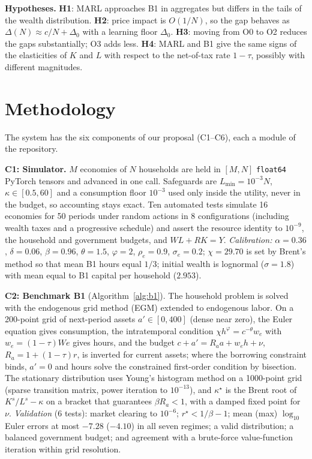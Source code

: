 \documentclass{article}
\begin{document}
\textbf{Hypotheses.} \textbf{H1}: MARL approaches B1 in aggregates but differs in the tails of the wealth distribution. \textbf{H2}: price impact is $O(1/N)$, so the gap behaves as $\Delta(N)\approx c/N+\Delta_0$ with a learning floor $\Delta_0$. \textbf{H3}: moving from O0 to O2 reduces the gaps substantially; O3 adds less. \textbf{H4}: MARL and B1 give the same signs of the elasticities of $K$ and $L$ with respect to the net-of-tax rate $1-\tau$, possibly with different magnitudes.

\section{Methodology}\label{sec:method}
The system has the six components of our proposal (C1--C6), each a module of the repository.

\textbf{C1: Simulator.} $M$ economies of $N$ households are held in $[M,N]$ \texttt{float64} PyTorch tensors and advanced in one call. Safeguards are $L_{\min}=10^{-3}N$, $\kappa\in[0.5,60]$ and a consumption floor $10^{-3}$ used only inside the utility, never in the budget, so accounting stays exact. Ten automated tests simulate 16 economies for 50 periods under random actions in 8 configurations (including wealth taxes and a progressive schedule) and assert the resource identity to $10^{-9}$, the household and government budgets, and $WL+RK=Y$. \emph{Calibration:} $\alpha=0.36$, $\delta=0.06$, $\beta=0.96$, $\theta=1.5$, $\varphi=2$, $\rho_e=0.9$, $\sigma_e=0.2$; $\chi=29.70$ is set by Brent's method so that mean B1 hours equal $1/3$; initial wealth is lognormal ($\sigma=1.8$) with mean equal to B1 capital per household ($2.953$).

\textbf{C2: Benchmark B1} (Algorithm~\ref{alg:b1}). The household problem is solved with the endogenous grid method (EGM) \cite{carroll2006} extended to endogenous labor. On a 200-point grid of next-period assets $a'\in[0,400]$ (dense near zero), the Euler equation gives consumption, the intratemporal condition $\chi h^\varphi=c^{-\theta}w_e$ with $w_e=(1-\tau)We$ gives hours, and the budget $c+a'=R_aa+w_eh+\nu$, $R_a=1+(1-\tau)r$, is inverted for current assets; where the borrowing constraint binds, $a'=0$ and hours solve the constrained first-order condition by bisection. The stationary distribution uses Young's histogram method \cite{young2010} on a 1000-point grid (sparse transition matrix, power iteration to $10^{-13}$), and $\kappa^\star$ is the Brent root of $K^s/L^s-\kappa$ on a bracket that guarantees $\beta R_a<1$, with a damped fixed point for $\nu$. \emph{Validation} (6 tests): market clearing to $10^{-6}$; $r^\star<1/\beta-1$; mean (max) $\log_{10}$ Euler errors at most $-7.28$ ($-4.10$) in all seven regimes; a valid distribution; a balanced government budget; and agreement with a brute-force value-function iteration within grid resolution.
\end{document}
